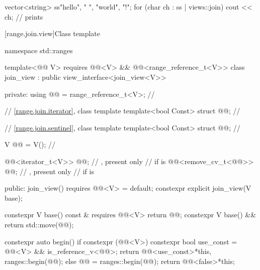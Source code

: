 \pnum
\begin{example}
\begin{codeblock}
vector<string> ss{"hello", " ", "world", "!"};
for (char ch : ss | views::join)
  cout << ch;                                   // prints 
\end{codeblock}
\end{example}

[range.join.view]{Class template }

%
%
%
%
\begin{codeblock}
namespace std::ranges {
  template<@@ V>
    requires @@<V> && @@<range_reference_t<V>>
  class join_view : public view_interface<join_view<V>> {
  private:
    using @@ = range_reference_t<V>;                  // \expos

    // \ref{range.join.iterator}, class template 
    template<bool Const>
      struct @@;                                      // \expos

    // \ref{range.join.sentinel}, class template 
    template<bool Const>
      struct @@;                                      // \expos

    V @@ = V();                                          // \expos

    @@<iterator_t<V>> @@;            // \expos, present only
                                                            // if  is 
    @@<remove_cv_t<@@>> @@;    // \expos, present only
                                                            // if  is 

  public:
    join_view() requires @@<V> = default;
    constexpr explicit join_view(V base);

    constexpr V base() const & requires @@<V> { return @@; }
    constexpr V base() && { return std::move(@@); }

    constexpr auto begin() {
      if constexpr (@@<V>) {
        constexpr bool use_const = @@<V> &&
                                   is_reference_v<@@>;
        return @@<use_const>{*this, ranges::begin(@@)};
      } else {
        @@ = ranges::begin(@@);
        return @@<false>{*this};
      }
    }

}}
\end{codeblock}
